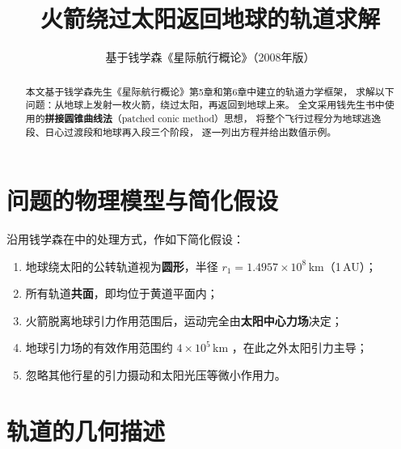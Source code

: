 \documentclass[12pt,a4paper]{ctexart}
\title{\heiti 火箭绕过太阳返回地球的轨道求解}
\author{\kaishu 基于钱学森《星际航行概论》（2008年版）}
\date{}
\begin{document}
\maketitle

\begin{abstract}
\noindent 本文基于钱学森先生《星际航行概论》\cite{qian2008}第5章和第6章中建立的轨道力学框架，
求解以下问题：从地球上发射一枚火箭，绕过太阳，再返回到地球上来。
全文采用钱先生书中使用的\textbf{拼接圆锥曲线法}（patched conic method）思想，
将整个飞行过程分为地球逃逸段、日心过渡段和地球再入段三个阶段，
逐一列出方程并给出数值示例。
\end{abstract}

\section{问题的物理模型与简化假设}

沿用钱学森在\cite[\S6.2, pp.~118]{qian2008}中的处理方式，作如下简化假设：
\begin{enumerate}[label=(\arabic*)]
    \item 地球绕太阳的公转轨道视为\textbf{圆形}，半径 $r_1 = 1.4957 \times 10^8$\,km（1\,AU）；
    \item 所有轨道\textbf{共面}，即均位于黄道平面内；
    \item 火箭脱离地球引力作用范围后，运动完全由\textbf{太阳中心力场}决定；
    \item 地球引力场的有效作用范围约 $4 \times 10^5$\,km \cite[\S6.1, pp.~118]{qian2008}，在此之外太阳引力主导；
    \item 忽略其他行星的引力摄动和太阳光压等微小作用力。
\end{enumerate}

\section{轨道的几何描述}
\end{document}
